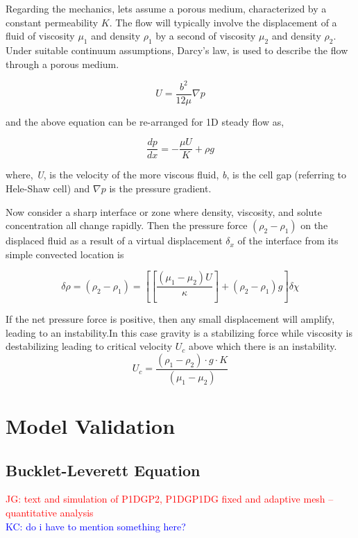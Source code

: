 \documentclass[preprint,authoryear,12pt]{elsarticle}
\begin{document}
Regarding the mechanics, lets assume a porous medium, characterized by a constant permeability $K$. The flow will typically involve the displacement of a fluid of viscosity $\mu_1$  and density $\rho_1$ by a second of viscosity $\mu_2$ and density $\rho_2$. Under suitable continuum assumptions, Darcy's law, is used to describe the flow through a porous medium.

\begin{equation}
 U = \frac{b^2}{12 \mu} \nabla p
\end{equation}

and the above equation can be re-arranged for 1D steady flow as,

\begin{equation}
 \frac{dp}{dx}= - \frac{\mu U}{K} + \rho g 
\end{equation}


where, \textit{U}, is the velocity of the more viscous fluid, \textit{b}, is the cell gap (referring to Hele-Shaw cell) and \textit{$\nabla p$} is the pressure gradient.

Now consider a sharp interface or zone where density, viscosity, and solute concentration all change rapidly. Then the pressure force $(\rho_2-\rho_1)$ on the displaced fluid as a result of a virtual displacement $\delta_x$ of the interface from its simple convected location is 

\begin{equation}
\delta\rho=(\rho_2-\rho_1)=[[\frac{(\mu_1-\mu_2)U}{\kappa}]+(\rho_2-\rho_1)g] \delta\chi
\end{equation}

If the net pressure force is positive, then any small displacement will amplify, leading to an instability.In this case gravity is a stabilizing force while viscosity is destabilizing leading to critical velocity $U_c$ above which there is an instability.\\

\begin{equation}
U_c = \frac{(\rho_1-\rho_2) \cdot g \cdot K}{(\mu_1-\mu_2)}
\end{equation}

 
\section{Model Validation}\label{section:ModelValidation}
 
\subsection{Bucklet-Leverett Equation}\label{section:BuckletLeverettEquation}
\textcolor{red}{JG: text and simulation of P1DGP2, P1DGP1DG fixed and adaptive mesh -- quantitative analysis}\\
\textcolor{blue}{KC: do i have to mention something here?\\}
\end{document}
